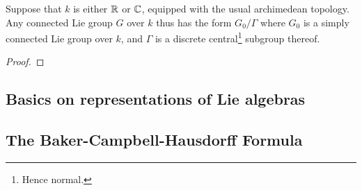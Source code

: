         \begin{proposition}
            Suppose that $k$ is either $\mathbb{R}$ or $\mathbb{C}$, equipped with the usual archimedean topology. Any connected Lie group $G$ over $k$ thus has the form $G_0/\Gamma$ where $G_0$ is a simply connected Lie group over $k$, and $\Gamma$ is a discrete central\footnote{Hence normal.} subgroup thereof.
        \end{proposition}
            \begin{proof}
                
            \end{proof}
    
    \subsection{Basics on representations of Lie algebras}
    
    \subsection{The Baker-Campbell-Hausdorff Formula}
